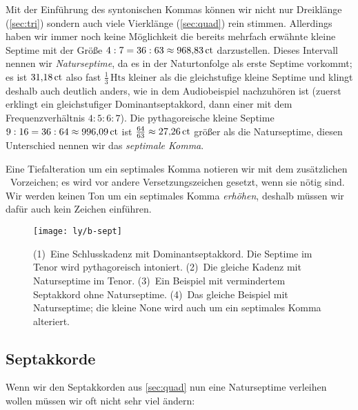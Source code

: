 Mit der Einführung des syntonischen Kommas können wir nicht nur Dreiklänge
(\cref{sec:tri}) sondern auch viele Vierklänge (\cref{sec:quad}) rein stimmen.
Allerdings haben wir immer noch keine Möglichkeit die bereits mehrfach erwähnte
kleine Septime mit der Größe $4:7=36:63\approx 968{,}83\,\mathrm{ct}$ darzustellen.
Dieses Intervall nennen wir \emph{Naturseptime}, da es in der Naturtonfolge als
erste Septime vorkommt; es ist $31{,}18\,\mathrm{ct}$ also fast
$\frac13\,\text{Hts}$ kleiner als die gleichstufige kleine Septime und
klingt deshalb auch deutlich anders, wie in dem Audiobeispiel nachzuhören
ist (zuerst erklingt ein gleichstufiger Dominantseptakkord, dann
einer mit dem Frequenzverhältnis $4:5:6:7$). Die pythagoreische kleine Septime
$9:16=36:64\approx 996{,}09\,\mathrm{ct}$ ist
$\frac{64}{63}\approx 27{,}26\,\mathrm{ct}$ größer als die Naturseptime, diesen
Unterschied nennen wir das \emph{septimale Komma}.

Eine Tiefalteration um ein septimales Komma notieren wir mit dem zusätzlichen
\septimal\ Vorzeichen; es wird vor andere Versetzungszeichen gesetzt, wenn sie
nötig sind. Wir werden keinen Ton um ein septimales Komma \emph{erhöhen},
deshalb müssen wir dafür auch kein Zeichen einführen.

\begin{figure}
	\centering
	\texttt{[image: ly/b-sept]}
	\caption{(1)~Eine Schlusskadenz mit Dominantseptakkord. Die Septime im
		Tenor wird pythagoreisch intoniert.
		\quad(2)~Die gleiche Kadenz mit Naturseptime im Tenor.
		\quad(3)~Ein Beispiel mit vermindertem Septakkord ohne Naturseptime.
		\quad(4)~Das gleiche Beispiel mit Naturseptime; die kleine None wird
		auch um ein septimales Komma alteriert.}\label{fig:sept}
\end{figure}

\subsection{Septakkorde}

Wenn wir den Septakkorden aus \cref{sec:quad} nun eine Naturseptime verleihen wollen müssen wir oft nicht sehr viel ändern:

